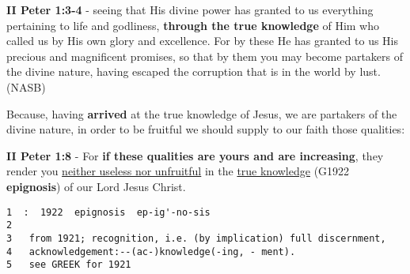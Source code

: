 \documentclass[11pt]{article}
\begin{document}
\textbf{II Peter 1:3-4} - seeing that His divine power has granted to us everything pertaining to life and godliness, \textbf{through the true knowledge} of Him who called us by His own glory and excellence. For by these He has granted to us His precious and magnificent promises, so that by them you may become partakers of the divine nature, having escaped the corruption that is in the world by lust. (NASB)

Because, having \textbf{arrived} at the true knowledge of Jesus, we are partakers of the divine nature, in order to be fruitful we should supply to our faith those qualities:

\textbf{II Peter 1:8} - For \textbf{if these qualities are yours and are increasing}, they render you \uline{neither useless nor unfruitful} in the \uline{true knowledge} (G1922 \textbf{epignosis}) of our Lord Jesus Christ.

\begin{verbatim}
1  :  1922  epignosis  ep-ig'-no-sis
2  
3   from 1921; recognition, i.e. (by implication) full discernment,
4   acknowledgement:--(ac-)knowledge(-ing, - ment).
5   see GREEK for 1921
\end{verbatim}
\end{document}

